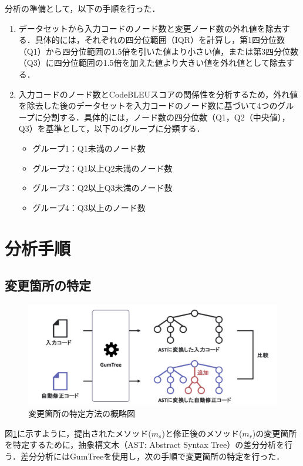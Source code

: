 \documentclass[11pt]{jreport}
\begin{document}
分析の準備として，以下の手順を行った．

\begin{enumerate}
   \item データセットから入力コードのノード数と変更ノード数の外れ値を除去する．具体的には，それぞれの四分位範囲（IQR）を計算し，第1四分位数（Q1）から四分位範囲の1.5倍を引いた値より小さい値，または第3四分位数（Q3）に四分位範囲の1.5倍を加えた値より大きい値を外れ値として除去する．

   \item 入力コードのノード数とCodeBLEUスコアの関係性を分析するため，外れ値を除去した後のデータセットを入力コードのノード数に基づいて4つのグループに分割する．具体的には，ノード数の四分位数（Q1，Q2（中央値），Q3）を基準として，以下の4グループに分類する．
   \begin{itemize}
       \item グループ1：Q1未満のノード数
       \item グループ2：Q1以上Q2未満のノード数
       \item グループ3：Q2以上Q3未満のノード数
       \item グループ4：Q3以上のノード数
   \end{itemize}
\end{enumerate}


\section{分析手順}

\subsection {変更箇所の特定}

\begin{figure}[ht]
    \centerline{\includegraphics[width=1.0\linewidth]{@BSthesis2024_Akamatsu/Akamatsu_figs/AST.pdf}}
    \caption{変更箇所の特定方法の概略図}
    \label{fig:Insufficient_documentation}
\end{figure}
図\ref{fig:Insufficient_documentation}に示すように，提出されたメソッド($m_s$)と修正後のメソッド($m_r$)の変更箇所を特定するために，抽象構文木（AST: Abstract Syntax Tree）の差分分析を行う．差分分析にはGumTree\cite{DBLP:conf/kbse/FalleriMBMM14}を使用し，次の手順で変更箇所の特定を行った．
\end{document}
